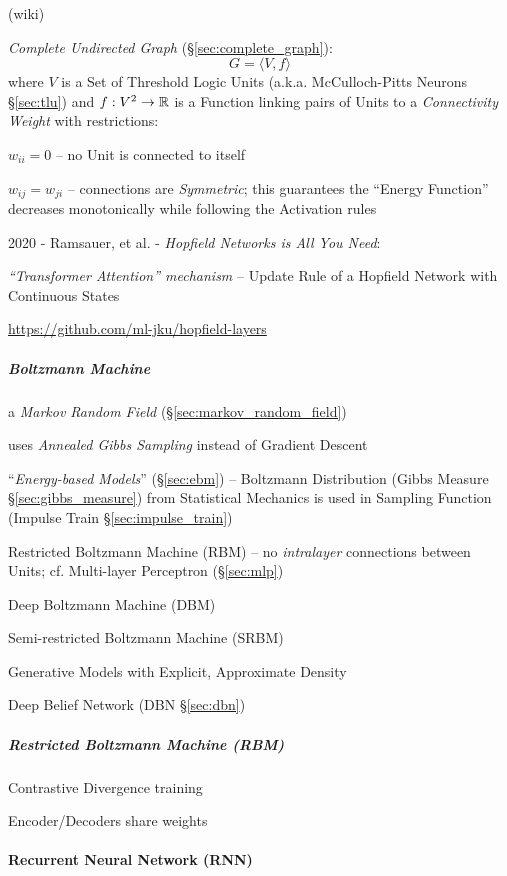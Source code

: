 (wiki)

\emph{Complete Undirected Graph} (\S\ref{sec:complete_graph}):
\[
  G = \langle{V, f}\rangle
\]
where $V$ is a Set of Threshold Logic Units (a.k.a. McCulloch-Pitts Neurons
\S\ref{sec:tlu}) and $f : V^2 \to \mathbb{R}$ is a Function linking pairs of
Units to a \emph{Connectivity Weight} with restrictions:

$w_{ii} = 0$ -- no Unit is connected to itself

$w_{ij} = w_{ji}$ -- connections are \emph{Symmetric}; this guarantees the
``Energy Function'' decreases monotonically while following the Activation rules

\asterism

2020 - Ramsauer, et al. - \emph{Hopfield Networks is All You Need}:

\emph{``Transformer Attention'' mechanism} -- Update Rule of a Hopfield Network
with Continuous States

\url{https://github.com/ml-jku/hopfield-layers}



\subparagraph{Boltzmann Machine}\label{sec:boltzmann_machine}\hfill

a \emph{Markov Random Field} (\S\ref{sec:markov_random_field})

uses \emph{Annealed Gibbs Sampling} instead of Gradient Descent

``\emph{Energy-based Models}'' (\S\ref{sec:ebm}) -- Boltzmann Distribution
(Gibbs Measure \S\ref{sec:gibbs_measure}) from Statistical Mechanics is used in
Sampling Function (Impulse Train \S\ref{sec:impulse_train})

Restricted Boltzmann Machine (RBM) -- no \emph{intralayer} connections between
Units; cf. Multi-layer Perceptron (\S\ref{sec:mlp})

Deep Boltzmann Machine (DBM)

Semi-restricted Boltzmann Machine (SRBM)

Generative Models with Explicit, Approximate Density

Deep Belief Network (DBN \S\ref{sec:dbn})



\subparagraph{Restricted Boltzmann Machine (RBM)}\label{sec:rbm}\hfill

Contrastive Divergence training

Encoder/Decoders share weights



\paragraph{Recurrent Neural Network (RNN)}\label{sec:rnn}\hfill


